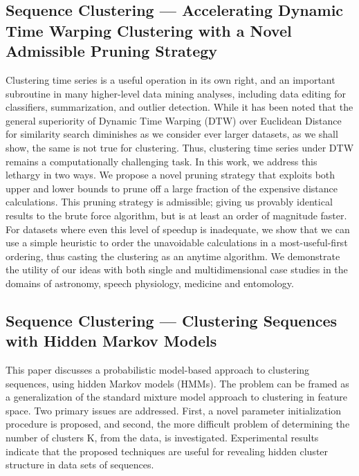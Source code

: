\documentclass{llncs}
\begin{document}
\subsection{Sequence Clustering --- Accelerating Dynamic Time Warping Clustering with a Novel Admissible Pruning Strategy\cite{Begum:2015:ADT:2783258.2783286}}
Clustering time series is a useful operation in its own right, and an important subroutine in many higher-level data mining analyses, including data editing for classifiers, summarization, and outlier detection. While it has been noted that the general superiority of Dynamic Time Warping (DTW) over Euclidean Distance for similarity search diminishes as we consider ever larger datasets, as we shall show, the same is not true for clustering. Thus, clustering time series under DTW remains a computationally challenging task. In this work, we address this lethargy in two ways. We propose a novel pruning strategy that exploits both upper and lower bounds to prune off a large fraction of the expensive distance calculations. This pruning strategy is admissible; giving us provably identical results to the brute force algorithm, but is at least an order of magnitude faster. For datasets where even this level of speedup is inadequate, we show that we can use a simple heuristic to order the unavoidable calculations in a most-useful-first ordering, thus casting the clustering as an anytime algorithm. We demonstrate the utility of our ideas with both single and multidimensional case studies in the domains of astronomy, speech physiology, medicine and entomology.

\subsection{Sequence Clustering --- Clustering Sequences with Hidden Markov Models\cite{smyth1997clustering}}
This paper discusses a probabilistic model-based approach to clustering sequences, using hidden Markov models (HMMs). The problem can be framed as a generalization of the standard mixture model approach to clustering in feature space. Two primary issues are addressed. First, a novel parameter initialization procedure is proposed, and second, the more difficult problem of determining the number of clusters K, from the data, is investigated. Experimental results indicate that the proposed techniques are useful for revealing hidden cluster structure in data sets of sequences.
\end{document}
